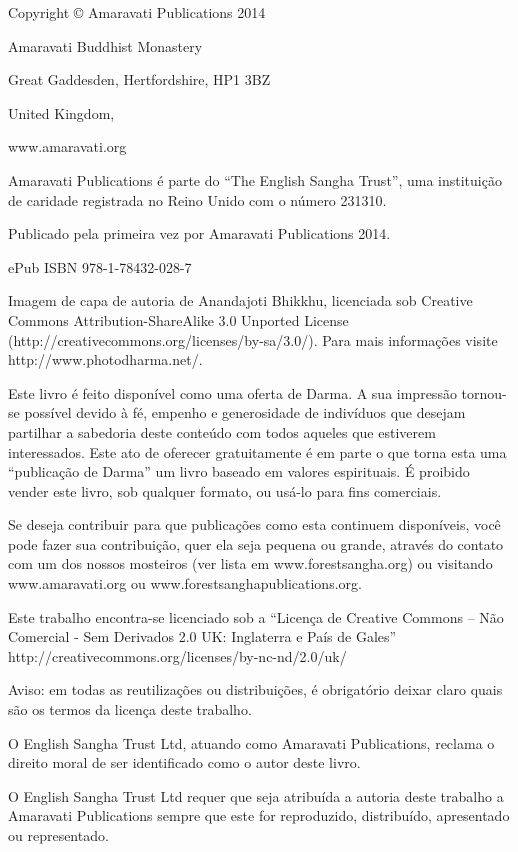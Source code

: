 
Copyright © Amaravati Publications 2014

Amaravati Buddhist Monastery

Great Gaddesden, Hertfordshire, HP1 3BZ

United Kingdom,

www.amaravati.org

Amaravati Publications é parte do “The English Sangha Trust”, uma
instituição de caridade registrada no Reino Unido com o número 231310.

Publicado pela primeira vez por Amaravati Publications 2014.

ePub ISBN 978-1-78432-028-7

Imagem de capa de autoria de Anandajoti Bhikkhu, licenciada sob Creative
Commons Attribution-ShareAlike 3.0 Unported License
(http://creativecommons.org/licenses/by-sa/3.0/). Para mais informações
visite http://www.photodharma.net/. 

Este livro é feito disponível como uma oferta de Darma. A sua impressão
tornou-se possível devido à fé, empenho e generosidade de indivíduos
que desejam partilhar a sabedoria deste conteúdo com todos aqueles que
estiverem interessados. Este ato de oferecer gratuitamente é em parte o
que torna esta uma “publicação de Darma” um livro baseado em valores
espirituais. É proibido vender este livro, sob qualquer formato, ou
usá-lo para fins comerciais.

Se deseja contribuir para que publicações como esta continuem
disponíveis, você pode fazer sua contribuição, quer ela seja pequena ou
grande, através do contato com um dos nossos mosteiros (ver lista em
www.forestsangha.org) ou visitando www.amaravati.org ou
www.forestsanghapublications.org.

Este trabalho encontra-se licenciado sob a “Licença de Creative Commons
-- Não Comercial - Sem Derivados 2.0 UK: Inglaterra e País de Gales”
http://creativecommons.org/licenses/by-nc-nd/2.0/uk/

Aviso: em todas as reutilizações ou distribuições, é obrigatório deixar
claro quais são os termos da licença deste trabalho.

O English Sangha Trust Ltd, atuando como Amaravati Publications, reclama
o direito moral de ser identificado como o autor deste livro.

O English Sangha Trust Ltd requer que seja atribuída a autoria deste
trabalho a Amaravati Publications sempre que este for reproduzido,
distribuído, apresentado ou representado.

